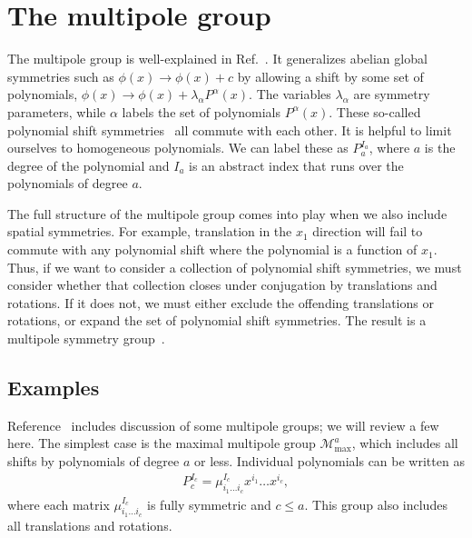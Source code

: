 \documentclass[twocolumn, longbibliography]{revtex4-2}
\newcommand{\goesto}{\rightarrow}
\begin{document}
\section{The multipole group}
\label{multipolegroup}

The multipole group is well-explained in Ref.~\cite{Gromov2019}. It generalizes abelian global symmetries such as $\phi(x) \goesto\phi (x) +c$ by allowing a shift by some set of polynomials, $\phi (x) \goesto \phi (x) + \lambda_\alpha P^\alpha(x)$. The variables $\lambda_\alpha$ are symmetry parameters, while $\alpha$ labels the set of polynomials $P^\alpha(x)$. These so-called polynomial shift symmetries~\cite{Griffin2015} all commute with each other. It is helpful to limit ourselves to homogeneous polynomials. We can label these as $P_a^{I_a}$, where $a$ is the degree of the polynomial and $I_a$ is an abstract index that runs over the polynomials of degree $a$.

The full structure of the multipole group comes into play when we also include spatial symmetries. For example,  translation in the $x_1$ direction will fail to commute with any polynomial shift where the polynomial is a function of $x_1$. Thus, if we want to consider a collection of polynomial shift symmetries, we must consider whether that collection closes under conjugation by translations and rotations. If it does not, we must either exclude the offending translations or rotations, or expand the set of polynomial shift symmetries. The result is a multipole symmetry group~\cite{Gromov2019}.

\subsection{Examples} \label{sub:examples}

Reference~\cite{Gromov2019} includes discussion of some multipole groups; we will review a few here. The simplest case is the maximal multipole group $\mathcal{M}^a_\text{max}$, which includes all shifts by polynomials of degree $a$ or less. Individual polynomials can be written as
\begin{align}
P_c^{I_c} = \mu^{I_c}_{i_1\dots i_c}x^{i_1}\dots x^{i_c}, \label{eqn:basis}
\end{align}
where each  matrix  $\mu^{I_c}_{i_1\dots i_c}$ is fully symmetric and $c\le a$. This group also includes all translations and rotations.
\end{document}
